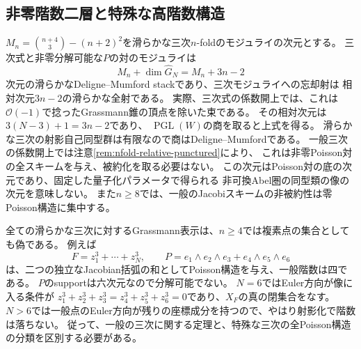 \subsection{非零階数二層と特殊な高階数構造}
$M_n=\binom{n+4}{3}-(n+2)^2$を滑らかな三次$n$-foldのモジュライの次元とする。
三次式と非零分解可能な$P$の対のモジュライは
\begin{equation}\label{eq:nfold-rank-two-dimension}
 M_n+\dim\widehat G_N=M_n+3n-2
\end{equation}
次元の滑らかなDeligne--Mumford stackであり、三次モジュライへの忘却射は
相対次元$3n-2$の滑らかな全射である。
実際、三次式の係数開上では、これは
$\mathcal O(-1)$で捻ったGrassmann錐の頂点を除いた束である。
その相対次元は$3(N-3)+1=3n-2$であり、
$\operatorname{PGL}(W)$の商を取ると上式を得る。
滑らかな三次の射影自己同型群は有限なので商はDeligne--Mumfordである。
一般三次の係数開上では注意\ref{rem:nfold-relative-punctured}により、
これは非零Poisson対の全スキームを与え、被約化を取る必要はない。
この次元はPoisson対の底の次元であり、固定した量子化パラメータで得られる
非可換Abel圏の同型類の像の次元を意味しない。
また$n\ge8$では、一般のJacobiスキームの非被約性は零Poisson構造に集中する。

全ての滑らかな三次に対するGrassmann表示は、$n\ge4$では複素点の集合としても偽である。
例えば
\begin{equation}\label{eq:nfold-fermat-rank-four}
 F=z_1^3+\cdots+z_N^3,\qquad
 P=e_1\wedge e_2\wedge e_3+e_4\wedge e_5\wedge e_6
\end{equation}
は、二つの独立なJacobian括弧の和としてPoisson構造を与え、一般階数は四である。
$P$のsupportは六次元なので分解可能でない。
$N=6$ではEuler方向が像に入る条件が
$z_1^3+z_2^3+z_3^3=z_4^3+z_5^3+z_6^3=0$であり、$X_F$の真の閉集合をなす。
$N>6$では一般点のEuler方向が残りの座標成分を持つので、やはり射影化で階数は落ちない。
従って、一般の三次に関する定理と、特殊な三次の全Poisson構造の分類を区別する必要がある。
